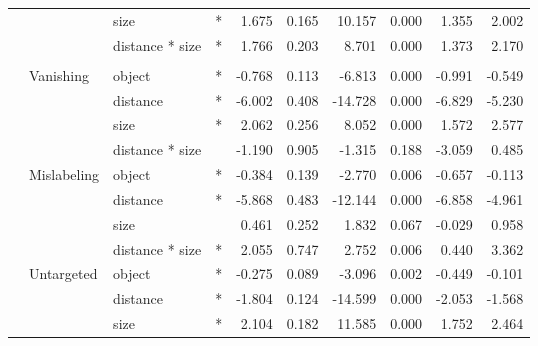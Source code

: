 \begin{longtable}[t]{llllrrrrrr}
\cmidrule{3-10}\nopagebreak
\hspace{1em} &  & size & * & 1.675 & 0.165 & 10.157 & 0.000 & 1.355 & 2.002\\
\cmidrule{3-10}\nopagebreak
\hspace{1em} &  & distance * size & * & 1.766 & 0.203 & 8.701 & 0.000 & 1.373 & 2.170\\
\cmidrule{1-10}\pagebreak[0]
\addlinespace[0.3em]
\multicolumn{10}{l}{\textbf{Faster R-CNN}}\\
\hspace{1em} & Vanishing & object & * & -0.768 & 0.113 & -6.813 & 0.000 & -0.991 & -0.549\\
\cmidrule{3-10}\nopagebreak
\hspace{1em} &  & distance & * & -6.002 & 0.408 & -14.728 & 0.000 & -6.829 & -5.230\\
\cmidrule{3-10}\nopagebreak
\hspace{1em} &  & size & * & 2.062 & 0.256 & 8.052 & 0.000 & 1.572 & 2.577\\
\cmidrule{3-10}\nopagebreak
\hspace{1em} &  & distance * size &  & -1.190 & 0.905 & -1.315 & 0.188 & -3.059 & 0.485\\
\cmidrule{2-10}\nopagebreak
\hspace{1em} & Mislabeling & object & * & -0.384 & 0.139 & -2.770 & 0.006 & -0.657 & -0.113\\
\cmidrule{3-10}\nopagebreak
\hspace{1em} &  & distance & * & -5.868 & 0.483 & -12.144 & 0.000 & -6.858 & -4.961\\
\cmidrule{3-10}\nopagebreak
\hspace{1em} &  & size &  & 0.461 & 0.252 & 1.832 & 0.067 & -0.029 & 0.958\\
\cmidrule{3-10}\nopagebreak
\hspace{1em} &  & distance * size & * & 2.055 & 0.747 & 2.752 & 0.006 & 0.440 & 3.362\\
\cmidrule{2-10}\nopagebreak
\hspace{1em} & Untargeted & object & * & -0.275 & 0.089 & -3.096 & 0.002 & -0.449 & -0.101\\
\cmidrule{3-10}\nopagebreak
\hspace{1em} &  & distance & * & -1.804 & 0.124 & -14.599 & 0.000 & -2.053 & -1.568\\
\cmidrule{3-10}\nopagebreak
\hspace{1em} &  & size & * & 2.104 & 0.182 & 11.585 & 0.000 & 1.752 & 2.464\\

\end{longtable}
